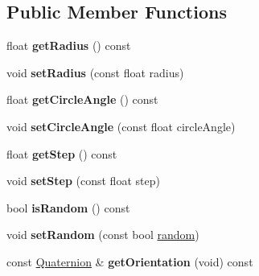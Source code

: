 \subsection*{Public Member Functions}
\begin{DoxyCompactItemize}
\item 
\mbox{\label{classPUCircleEmitter_ac01449343d92e4682159c2563619264c}} 
float {\bfseries get\+Radius} () const
\item 
\mbox{\label{classPUCircleEmitter_a9dc34ff83fa7ffceef2e092962d6e82f}} 
void {\bfseries set\+Radius} (const float radius)
\item 
\mbox{\label{classPUCircleEmitter_ac3e08c14d7e25b78c14fc47156e078fa}} 
float {\bfseries get\+Circle\+Angle} () const
\item 
\mbox{\label{classPUCircleEmitter_acf6d37ae14d9dfb0b3dae4f03eb2497a}} 
void {\bfseries set\+Circle\+Angle} (const float circle\+Angle)
\item 
\mbox{\label{classPUCircleEmitter_a556fdb6bbd3ae21e5b36d9631c686f74}} 
float {\bfseries get\+Step} () const
\item 
\mbox{\label{classPUCircleEmitter_a5dd53f8accbc80a9c9f094b9e9205044}} 
void {\bfseries set\+Step} (const float step)
\item 
\mbox{\label{classPUCircleEmitter_acb6b4094ea255b0302b026bfea62e12e}} 
bool {\bfseries is\+Random} () const
\item 
\mbox{\label{classPUCircleEmitter_aec45619e8fb64a0c93cc5be55d5a29e5}} 
void {\bfseries set\+Random} (const bool \hyperlink{group__base_ga84e4437f43bda4dd8f4cabda651f8eb7}{random})
\item 
\mbox{\label{classPUCircleEmitter_a01ffe997c1c3edd1b080d516fe51498d}} 
const \hyperlink{classQuaternion}{Quaternion} \& {\bfseries get\+Orientation} (void) const
\item 
\mbox{\label{classPUCircleEmitter_a261ad9cbfe8f1c3b732e4e717947f37b}} 

\end{DoxyCompactItemize}
